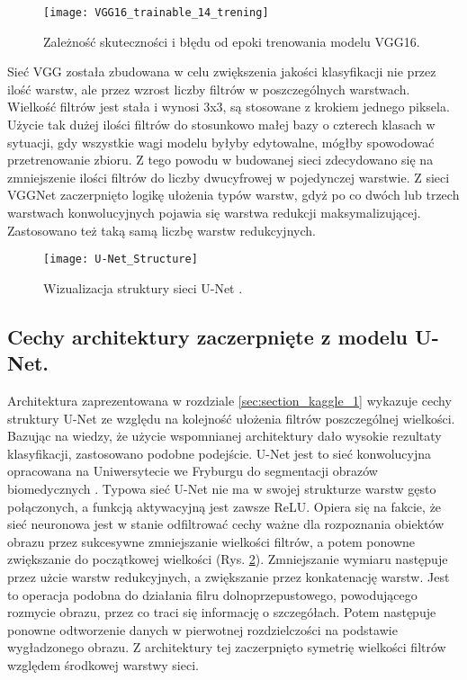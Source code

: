 {\begin{figure}[h!]
	\centering
	\centering
		\texttt{[image: VGG16\_trainable\_14\_trening]}	
	\caption{Zależność skuteczności i błędu od epoki trenowania modelu VGG16.}
	\label{fig:VGG16_trainable_14_trening}
	\label{fig:ann_visualisation}
\end{figure}

Sieć VGG została zbudowana w celu zwiększenia jakości klasyfikacji nie przez ilość warstw, ale przez wzrost liczby filtrów w poszczególnych warstwach. Wielkość filtrów jest stała i wynosi 3x3, są stosowane z krokiem jednego piksela. Użycie tak dużej ilości filtrów do stosunkowo małej bazy o czterech klasach w sytuacji, gdy wszystkie wagi modelu byłyby edytowalne, mógłby spowodować przetrenowanie zbioru. Z tego powodu w budowanej sieci zdecydowano się na zmniejszenie ilości filtrów do liczby dwucyfrowej w pojedynczej warstwie. Z sieci VGGNet zaczerpnięto logikę ułożenia typów warstw, gdyż po co dwóch lub trzech warstwach konwolucyjnych pojawia się warstwa redukcji maksymalizującej. Zastosowano też taką samą liczbę warstw redukcyjnych.

\begin{figure}[h!]
	\centering
	\centering
		\texttt{[image: U-Net\_Structure]}	
	\caption{Wizualizacja struktury sieci U-Net \cite{Silburt2019LunarCI}.}
	\label{fig:u-net_structure}
\end{figure}

}

\subsection{Cechy architektury zaczerpnięte z modelu U-Net.}

Architektura zaprezentowana w rozdziale \ref{sec:section_kaggle_1} wykazuje cechy struktury U-Net ze względu na kolejność ułożenia filtrów poszczególnej wielkości. Bazując na wiedzy, że użycie wspomnianej architektury dało wysokie rezultaty klasyfikacji, zastosowano podobne podejście. U-Net jest to sieć konwolucyjna opracowana na Uniwersytecie we Fryburgu do segmentacji obrazów biomedycznych \cite{Ronneberger2015UNetCN}. Typowa sieć U-Net nie ma w swojej strukturze warstw gęsto połączonych, a funkcją aktywacyjną jest zawsze ReLU. Opiera się na fakcie, że sieć neuronowa jest w stanie odfiltrować cechy ważne dla rozpoznania obiektów obrazu przez sukcesywne zmniejszanie wielkości filtrów, a potem ponowne zwiększanie do początkowej wielkości (Rys. \ref{fig:u-net_structure}). Zmniejszanie wymiaru następuje przez użcie warstw redukcyjnych, a zwiększanie przez konkatenację warstw. Jest to operacja podobna do działania filru dolnoprzepustowego, powodującego rozmycie obrazu, przez co traci się informację o szczegółach. Potem następuje ponowne odtworzenie danych w pierwotnej rozdzielczości na podstawie wygładzonego obrazu. Z architektury tej zaczerpnięto symetrię wielkości filtrów względem środkowej warstwy sieci.

